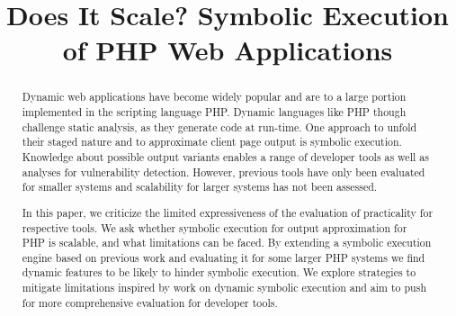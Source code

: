 \documentclass[sigconf]{acmart}
\begin{document}
\title{Does It Scale? Symbolic Execution of PHP Web Applications}


\affiliation{%
}

\affiliation{%
}

\affiliation{%
}


\renewcommand{\shortauthors}{
}


\begin{abstract}
Dynamic web applications have become widely popular and are to a large portion
implemented in the scripting language PHP. Dynamic languages like PHP though
challenge static analysis, as they generate code at run-time. One approach to unfold their
staged nature and to approximate client page output is symbolic execution.
Knowledge about possible output variants enables a range of developer tools as
well as analyses for vulnerability detection. However, previous tools have only
been evaluated for smaller systems and scalability for larger systems has not
been assessed.
 
In this paper, we criticize the limited expressiveness of the evaluation of
practicality for respective tools. We ask whether symbolic execution for output
approximation for PHP is scalable, and what limitations can be faced. By
extending a symbolic execution engine based on previous work and evaluating it
for some larger PHP systems we find dynamic features to be likely to hinder
symbolic execution. We explore strategies to mitigate limitations inspired by
work on dynamic symbolic execution and aim to push for more comprehensive
evaluation for developer tools.
\end{abstract}
\end{document}

